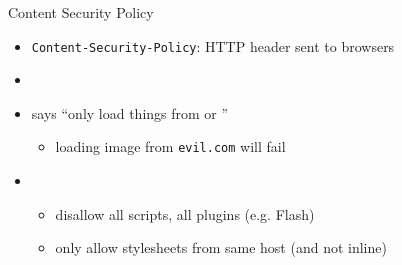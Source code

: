 
\begin{frame}[fragile,label=CSPExs]{Content Security Policy}
    \begin{itemize}
        \item \texttt{Content-Security-Policy}: HTTP header sent to browsers
        \item {}
        \item says ``only load things from  or ''
            \begin{itemize}
            \item loading image from \texttt{evil.com} will fail
            \end{itemize}
        \item {}
            \begin{itemize}
            \item disallow all scripts, all plugins (e.g. Flash)
            \item only allow stylesheets from same host (and not inline)
            \end{itemize}
    \end{itemize}

\end{frame}

